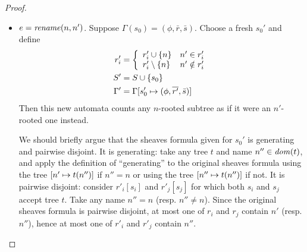 \begin{proof}
\begin{itemize}
\item $e=\mathit{rename}(n,n')$. Suppose $\Gamma(s_0)=(\phi,\bar r,\bar s)$. Choose
a fresh $s_0'$ and define
\begin{align*}
    r'_i &= \left\{\begin{array}{ll}
        r'_i \cup \{n\} & n' \in r'_i \\
        r'_i \setminus \{n\} & n' \notin r'_i
        \end{array}\right. \\
    S' &= S \cup \{s_0\} \\
    \Gamma' &= \Gamma[s_0' \mapsto (\phi,\overline{r'},\bar s)]
\end{align*}
Then this new automata counts any $n$-rooted subtree as if it were an
$n'$-rooted one instead.

We should briefly argue that the sheaves formula given for $s_0'$ is
generating and pairwise disjoint.  It is generating: take any tree $t$ and
name $n'' \in \mathit{dom}(t)$, and apply the definition of ``generating'' to the
original sheaves formula using the tree $[n' \mapsto t(n'')]$ if $n'' = n$ or
using the tree $[n'' \mapsto t(n'')]$ if not. It is pairwise disjoint: consider
$r'_i[s_i]$ and $r'_j[s_j]$ for which both $s_i$ and $s_j$ accept tree $t$.
Take any name $n'' = n$ (resp. $n'' \ne n$).  Since the original sheaves
formula is pairwise disjoint, at most one of $r_i$ and $r_j$ contain $n'$
(resp. $n''$), hence at most one of $r'_i$ and $r'_j$ contain $n''$.

%


\end{itemize}
\end{proof}
